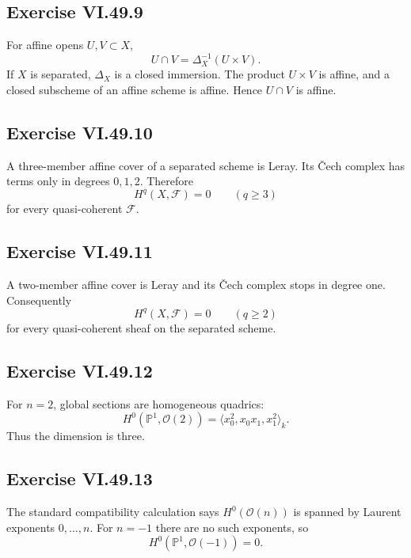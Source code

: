\subsection*{Exercise VI.49.9}
\begin{solution}
For affine opens \(U,V\subset X\),
\[
U\cap V=\Delta_X^{-1}(U\times V).
\]
If \(X\) is separated, \(\Delta_X\) is a closed immersion.  The product \(U\times V\) is affine, and a closed subscheme of an affine scheme is affine.  Hence \(U\cap V\) is affine.
\end{solution}

\subsection*{Exercise VI.49.10}
\begin{solution}
A three-member affine cover of a separated scheme is Leray.  Its Čech complex has terms only in degrees \(0,1,2\).  Therefore
\[
H^q(X,\mathcal F)=0\qquad(q\ge3)
\]
for every quasi-coherent \(\mathcal F\).
\end{solution}

\subsection*{Exercise VI.49.11}
\begin{solution}
A two-member affine cover is Leray and its Čech complex stops in degree one.  Consequently
\[
H^q(X,\mathcal F)=0\qquad(q\ge2)
\]
for every quasi-coherent sheaf on the separated scheme.
\end{solution}

\subsection*{Exercise VI.49.12}
\begin{solution}
For \(n=2\), global sections are homogeneous quadrics:
\[
H^0(\mathbb P^1,\mathcal O(2))
=\langle x_0^2,x_0x_1,x_1^2\rangle_k.
\]
Thus the dimension is three.
\end{solution}

\subsection*{Exercise VI.49.13}
\begin{solution}
The standard compatibility calculation says \(H^0(\mathcal O(n))\) is spanned by Laurent exponents \(0,\ldots,n\).  For \(n=-1\) there are no such exponents, so
\[
H^0(\mathbb P^1,\mathcal O(-1))=0.
\]
\end{solution}

